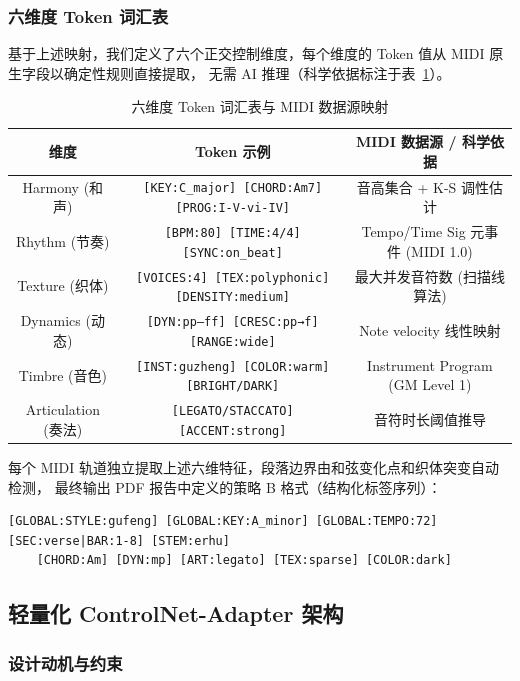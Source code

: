\subsubsection{六维度 Token 词汇表}

基于上述映射，我们定义了六个正交控制维度，每个维度的 Token 值从 MIDI 原生字段以确定性规则直接提取，
无需 AI 推理（科学依据标注于表~\ref{tab:token_vocab}）。

\begin{table}[H]
\centering
\caption{六维度 Token 词汇表与 MIDI 数据源映射}
\label{tab:token_vocab}
\begin{tabular}{c|c|c}
\toprule
\textbf{维度} & \textbf{Token 示例} & \textbf{MIDI 数据源 / 科学依据} \\
\midrule
Harmony (和声) & \texttt{[KEY:C\_major] [CHORD:Am7] [PROG:I-V-vi-IV]} & 音高集合 + K-S 调性估计 \cite{krumhansl} \\
Rhythm (节奏) & \texttt{[BPM:80] [TIME:4/4] [SYNC:on\_beat]} & Tempo/Time Sig 元事件 (MIDI 1.0) \\
Texture (织体) & \texttt{[VOICES:4] [TEX:polyphonic] [DENSITY:medium]} & 最大并发音符数 (扫描线算法) \\
Dynamics (动态) & \texttt{[DYN:pp--ff] [CRESC:pp→f] [RANGE:wide]} & Note velocity 线性映射 \cite{maestro} \\
Timbre (音色) & \texttt{[INST:guzheng] [COLOR:warm] [BRIGHT/DARK]} & Instrument Program (GM Level 1) \\
Articulation (奏法) & \texttt{[LEGATO/STACCATO] [ACCENT:strong]} & 音符时长阈值推导 \cite{groove} \\
\bottomrule
\end{tabular}
\end{table}

每个 MIDI 轨道独立提取上述六维特征，段落边界由和弦变化点和织体突变自动检测，
最终输出 PDF 报告中定义的策略 B 格式（结构化标签序列）：

\begin{verbatim}
[GLOBAL:STYLE:gufeng] [GLOBAL:KEY:A_minor] [GLOBAL:TEMPO:72]
[SEC:verse|BAR:1-8] [STEM:erhu]
    [CHORD:Am] [DYN:mp] [ART:legato] [TEX:sparse] [COLOR:dark]
\end{verbatim}

\subsection{轻量化 ControlNet-Adapter 架构}

\subsubsection{设计动机与约束}

